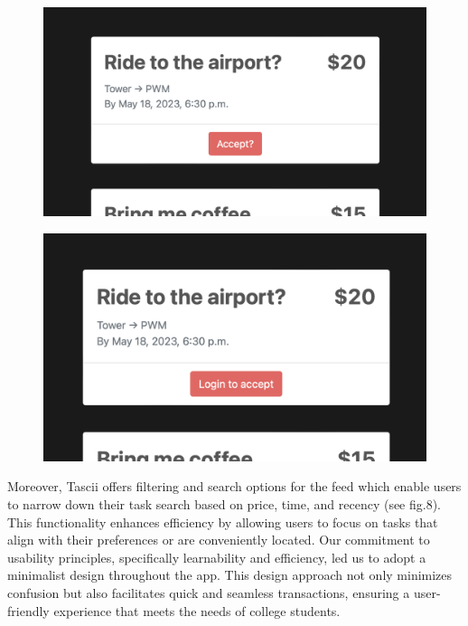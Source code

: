 \begin{figure}
\centering
\begin{minipage}{.5\textwidth}
  \centering
  \includegraphics[width=.8\linewidth]{images/LoggedInPost.png}
  \label{fig:test1}
\end{minipage}%
\begin{minipage}{.5\textwidth}
  \centering
  \includegraphics[width=.8\linewidth]{images/LoggedOutPost.png}
  \label{fig:test2}
\end{minipage}
\end{figure}


Moreover, Tascii offers filtering and search options for the feed which enable users to narrow down their task search based on price, time, and recency (see fig.8). This functionality enhances efficiency by allowing users to focus on tasks that align with their preferences or are conveniently located. Our commitment to usability principles, specifically learnability and efficiency, led us to adopt a minimalist design throughout the app. This design approach not only minimizes confusion but also facilitates quick and seamless transactions, ensuring a user-friendly experience that meets the needs of college students.

